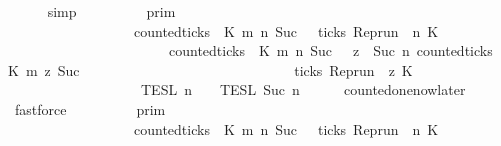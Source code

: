\begin{isabellebody}
\ \ \ \ \isamarkupfalse%
\ simp\isanewline
\ \ \isamarkupfalse%
\ \isamarkupfalse%
\ {\isacartoucheopen}{\isachardot}{\isachardot}{\isachardot}\ {\isacharequal}\ {\isasymlbrakk}{\isasymlbrakk}\ {\isasymGamma}\ {\isasymrbrakk}{\isasymrbrakk}\isactrlsub p\isactrlsub r\isactrlsub i\isactrlsub m\ \isanewline
\ \ \ \ \ \ \ \ \ \ \ \ \ \ \ \ {\isasyminter}\ {\isacharbraceleft}{\isasymrho}{\isachardot}\ {\isacharparenleft}{\isasymnot}counted{\isacharunderscore}ticks\ {\isasymrho}\ K\ m\ n\ {\isacharparenleft}Suc\ {}{\isacharparenright}\ {\isasymor}\ ticks\ {\isacharparenleft}{\isacharparenleft}Rep{\isacharunderscore}run\ {\isasymrho}{\isacharparenright}\ n\ K\isanewline
\ \ \ \ \ \ \ \ \ \ \ \ \ \ \ \ \ \ \ \ \ \ {\isasymand}\ {\isacharparenleft}counted{\isacharunderscore}ticks\ {\isasymrho}\ K\ m\ n\ {\isacharparenleft}Suc\ {}{\isacharparenright}\ {\isasymor}\ {\isacharparenleft}{\isasymforall}z\ {\isasymge}\ Suc\ n{\isachardot}\ {\isacharparenleft}counted{\isacharunderscore}ticks\ {\isasymrho}\ K\ m\ z\ {\isacharparenleft}Suc\ {}{\isacharparenright}{\isacharparenright}\isanewline
\ \ \ \ \ \ \ \ \ \ \ \ \ \ \ \ \ \ \ \ \ \ \ \ \ \ \ \ {\isasymlongrightarrow}\ ticks\ {\isacharparenleft}{\isacharparenleft}Rep{\isacharunderscore}run\ {\isasymrho}{\isacharparenright}\ z\ K\ {\isacharbraceright}\isanewline
\ \ \ \ \ \ \ \ \ \ \ \ \ \ \ \ {\isasyminter}\ {\isasymlbrakk}{\isasymlbrakk}\ {\isasymPsi}\ {\isasymrbrakk}{\isasymrbrakk}\isactrlsub T\isactrlsub E\isactrlsub S\isactrlsub L\isactrlbsup {\isasymge}\ n\isactrlesup \ {\isasyminter}\ {\isasymlbrakk}{\isasymlbrakk}\ {\isasymPhi}\ {\isasymrbrakk}{\isasymrbrakk}\isactrlsub T\isactrlsub E\isactrlsub S\isactrlsub L\isactrlbsup {\isasymge}\ Suc\ n\isactrlesup {\isacartoucheclose}\isanewline
\ \ \ \ \isamarkupfalse%
\ counted{\isacharunderscore}one{\isacharunderscore}now{\isacharunderscore}later\ \isamarkupfalse%
\ fastforce\isanewline
\ \ \isamarkupfalse%
\ \isamarkupfalse%
\ {\isacartoucheopen}{\isachardot}{\isachardot}{\isachardot}\ {\isacharequal}\ {\isasymlbrakk}{\isasymlbrakk}\ {\isasymGamma}\ {\isasymrbrakk}{\isasymrbrakk}\isactrlsub p\isactrlsub r\isactrlsub i\isactrlsub m\ \isanewline
\ \ \ \ \ \ \ \ \ \ \ \ \ \ \ \ {\isasyminter}\ {\isacharbraceleft}{\isasymrho}{\isachardot}\ {\isacharparenleft}{\isasymnot}counted{\isacharunderscore}ticks\ {\isasymrho}\ K\ m\ n\ {\isacharparenleft}Suc\ {}{\isacharparenright}\ {\isasymor}\ ticks\ {\isacharparenleft}{\isacharparenleft}Rep{\isacharunderscore}run\ {\isasymrho}{\isacharparenright}\ n\ K\isanewline

\end{isabellebody}
